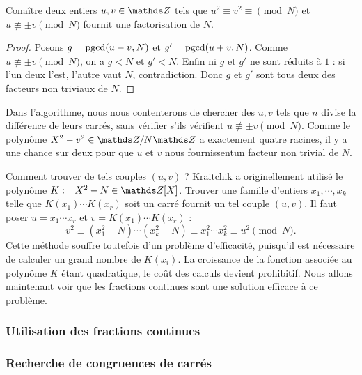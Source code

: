 \begin{lemme}
	Conaître deux entiers $u, v \in \Z$ tels que $u^2 \equiv v^2 \equiv
	\pmod{N}$ et $u\not\equiv \pm v\pmod{N}$ fournit une factorisation de $N$.
\end{lemme}

\begin{proof}
	Posons $g =\operatorname{pgcd}(u-v, N)$ et $g' = \operatorname{pgcd}(u+v, N)$. Comme $u\not\equiv \pm
	v\pmod{N}$, on a $g<N$ et $g'<N$. Enfin ni $g$ et $g'$ ne sont réduits à
	$1$ : si l'un deux l'est, l'autre vaut $N$, contradiction. Donc $g$ et $g'$
	sont tous deux des facteurs non triviaux de $N$.
\end{proof}

\begin{remarque}
	Dans l'algorithme, nous nous contenterons de chercher des $u, v$ tels que
	$n$ divise la différence de leurs carrés, sans vérifier s'ils vérifient $u
	\not\equiv \pm v\pmod{N}$. Comme le polynôme $X^2 - v^2 \in \Z/N\Z$ a
	exactement quatre racines, il y a \og{} une chance sur deux \fg pour que
	$u$ et $v$ nous fournissentun facteur non trivial de $N$. \\
\end{remarque}

Comment trouver de tels couples $(u, v)$ ? Kraitchik a originellement utilisé
le polynôme $K := X^2 - N \in \Z[X]$. Trouver une famille d'entiers $x_1,
\cdots, x_k$ telle que $K(x_1)\cdots K(x_r)$ soit un carré fournit un tel
couple $(u, v)$. Il faut poser $u = x_1\cdots x_r$ et $v = K(x_1)\cdots K(x_r)$
: \[v^2 \equiv (x_1^2 - N)\cdots (x_k^2 - N) \equiv x_1^2 \cdots x_k^2 \equiv
u^2\pmod{N}.\] Cette méthode souffre toutefois d'un problème d'efficacité,
puisqu'il est nécessaire de calculer un grand nombre de $K(x_i)$. La croissance
de la fonction associée au polynôme $K$ étant quadratique, le coût des calculs
devient prohibitif. Nous allons maintenant voir que les fractions continues
sont une solution efficace à ce problème. \\

\subsubsection{Utilisation des fractions continues}

\subsubsection{Recherche de congruences de carrés}
